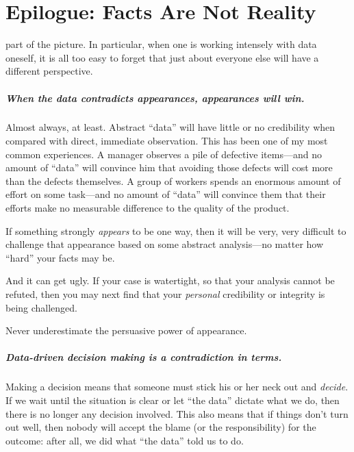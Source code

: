 
\chapter{Epilogue: Facts Are Not Reality}{}{}
\label{ch:epilogue}

 part of the picture. In particular, when
one is working intensely with data oneself, it is all too easy to forget
that just about everyone else will have a different
perspective.\vspace*{-8pt}


\leaflong{-12pt}
\paragraph{When the data contradicts appearances, appearances will win.}
   Almost
always, at least. Abstract ``data'' will have little or no credibility
when compared with direct, immediate observation. This has been one of
my most common experiences. A manager observes a pile of defective
items---and no amount of ``data'' will convince him that avoiding those
defects will cost more than the defects themselves. A group of workers
spends an enormous amount of effort on some task---and no amount of
``data'' will convince them that their efforts make no measurable
difference to the quality of the product.

If something strongly \emph{appears} to be one way, then it will be
very, very difficult to challenge that appearance based on some
abstract analysis---no matter how ``hard'' your facts may be.

And it can get ugly. If your case is watertight, so that your analysis
cannot be refuted, then you may next find that your \emph{personal}
credibility or integrity is being challenged.

Never underestimate the persuasive power of appearance.\vspace*{-8pt}


\paragraph{Data-driven decision making is a contradiction in terms.} 
  Making a decision means that
someone must stick his or her neck out and
\emph{decide}. If we wait until the situation is clear or let ``the
data'' dictate what we do, then there is no longer any decision
involved. This also means  that if things don't turn out well, then
nobody will accept the blame (or the responsibility) for the outcome:
after all, we did what ``the data'' told us to do.


